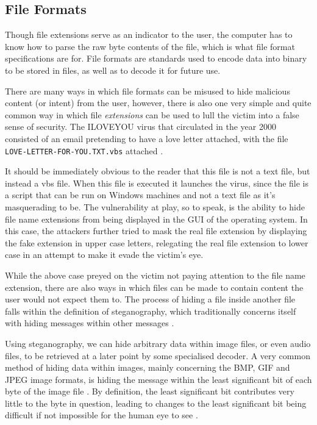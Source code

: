 \subsection{File Formats}

Though file extensions serve as an indicator to the user, the computer has to know how to parse the raw byte contents of
the file, which is what file format specifications are for. File formats are standards used to encode data into binary 
to be stored in files, as well as to decode it for future use. 

There are many ways in which file formats can be misused to hide malicious content (or intent) from the user, however,
there is also one very simple and quite common way in which file \emph{extensions} can be used to lull the victim into a
false sense of security. The ILOVEYOU virus that circulated in the year 2000 consisted of an email pretending to have a
love letter attached, with the file \verb+LOVE-LETTER-FOR-YOU.TXT.vbs+ attached \cite{viruses-revealed-book}. 

It should be immediately obvious to the reader that this file is not a text file, but instead a \acrfull{vbs} file. When
this file is executed it launches the virus, since the file is a script that can be run on Windows machines
and not a text file as it's masquerading to be. The vulnerability at play, so to speak, is the ability to hide file name 
extensions from being displayed in the GUI of the operating system. In this case, the attackers further tried to mask
the real file extension by displaying the fake extension in upper case letters, relegating the real file extension to
lower case in an attempt to make it evade the victim's eye.

While the above case preyed on the victim not paying attention to the file name extension, there are also ways in which
files can be made to contain content the user would not expect them to. The process of hiding a file inside another
file falls within the definition of steganography, which traditionally concerns itself with hiding messages within other
messages \cite{steganography}.

Using steganography, we can hide arbitrary data within image files, or even audio files, to be retrieved at a later
point by some specialised decoder. A very common method of hiding data within images, mainly concerning the \acrfull{BMP},
\acrfull{GIF} and \acrfull{JPEG} image formats, is hiding the message within the least significant bit of each byte of the image file
\cite{steganography}. By definition, the least significant bit contributes very little to the byte in question, leading
to changes to the least significant bit being difficult if not impossible for the human eye to see \cite{steganography}.

